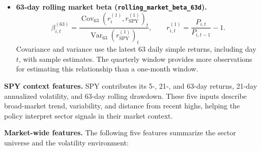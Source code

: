 \documentclass[11pt,letterpaper]{article}
\begin{document}
\begin{itemize}
  \item \textbf{63-day rolling market beta
  (\texttt{rolling\_market\_beta\_63d}).}
  \[
    \beta_{i,t}^{(63)}=
      \frac{\operatorname{Cov}_{63}
        (r^{(1)}_{i},r^{(1)}_{\mathrm{SPY}})_t}
      {\operatorname{Var}_{63}(r^{(1)}_{\mathrm{SPY}})_t},
    \qquad
    r^{(1)}_{i,t}=\frac{P_{i,t}}{P_{i,t-1}}-1.
  \]
  Covariance and variance use the latest 63 daily simple returns, including
  day $t$, with sample estimates. The quarterly window provides more observations
  for estimating this relationship than a one-month window.

\end{itemize}

\textbf{SPY context features.} SPY contributes its 5-, 21-, and 63-day returns,
21-day annualized volatility, and 63-day rolling drawdown. These five inputs describe broad-market
trend, variability, and distance from recent highs, helping the policy interpret
sector signals in their market context. 

\textbf{Market-wide features.} The following five features summarize the sector
universe and the volatility environment:
\end{document}
